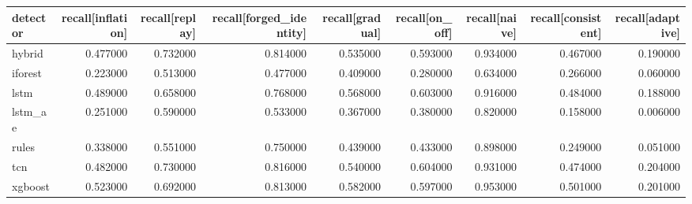 \begin{tabular}{lrrrrrrrr}
\toprule
detector & recall[inflation] & recall[replay] & recall[forged\_identity] & recall[gradual] & recall[on\_off] & recall[naive] & recall[consistent] & recall[adaptive] \\
\midrule
hybrid & 0.477000 & 0.732000 & 0.814000 & 0.535000 & 0.593000 & 0.934000 & 0.467000 & 0.190000 \\
iforest & 0.223000 & 0.513000 & 0.477000 & 0.409000 & 0.280000 & 0.634000 & 0.266000 & 0.060000 \\
lstm & 0.489000 & 0.658000 & 0.768000 & 0.568000 & 0.603000 & 0.916000 & 0.484000 & 0.188000 \\
lstm\_ae & 0.251000 & 0.590000 & 0.533000 & 0.367000 & 0.380000 & 0.820000 & 0.158000 & 0.006000 \\
rules & 0.338000 & 0.551000 & 0.750000 & 0.439000 & 0.433000 & 0.898000 & 0.249000 & 0.051000 \\
tcn & 0.482000 & 0.730000 & 0.816000 & 0.540000 & 0.604000 & 0.931000 & 0.474000 & 0.204000 \\
xgboost & 0.523000 & 0.692000 & 0.813000 & 0.582000 & 0.597000 & 0.953000 & 0.501000 & 0.201000 \\
\bottomrule
\end{tabular}
